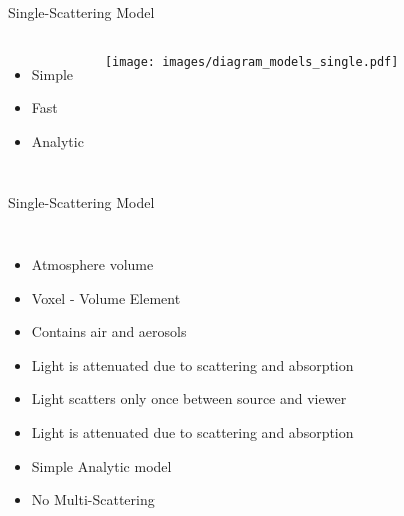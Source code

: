 \documentclass[compress,red,12pt]{beamer}
\begin{document}
\begin{frame}{Single-Scattering Model}
  \begin{columns}[C]
    \begin{itemize}
    \item Simple
    \item Fast
    \item Analytic
    \end{itemize}

    \texttt{[image: images/diagram\_models\_single.pdf]}

  \end{columns}
\end{frame}


\begin{frame}{Single-Scattering Model}
  \begin{columns}[c]
    \begin{itemize}
    \item <1-2> Atmosphere volume
    \item <2-3> Voxel - Volume Element
    \item <3> Contains air and aerosols
    \item <4> Light is attenuated due to scattering and absorption
    \item <5> Light scatters only once between source and viewer
    \item <6> Light is attenuated due to scattering and absorption
    \item <7> Simple Analytic model
    \item <7> No Multi-Scattering
    \end{itemize}


\end{columns}
\end{frame}
\end{document}
